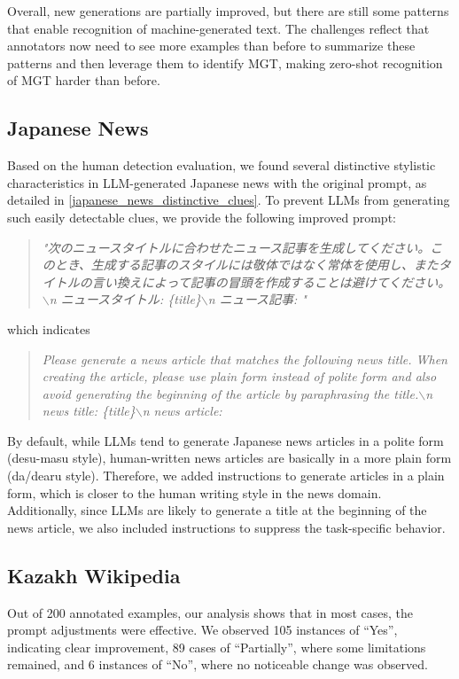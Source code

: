 Overall, new generations are partially improved, but there are still some patterns that enable recognition of machine-generated text. The challenges reflect that annotators now need to see more examples than before to summarize these patterns and then leverage them to identify MGT, making zero-shot recognition of MGT harder than before. 


\subsection{Japanese News}
Based on the human detection evaluation, we found several distinctive stylistic characteristics in LLM-generated Japanese news with the original prompt, as detailed in \ref{japanese_news_distinctive_clues}.
To prevent LLMs from generating such easily detectable clues, we provide the following improved prompt:

\begin{quote}
    \textit{"次のニュースタイトルに合わせたニュース記事を生成してください。このとき、生成する記事のスタイルには敬体ではなく常体を使用し、またタイトルの言い換えによって記事の冒頭を作成することは避けてください。$\backslash$n ニュースタイトル: \{title\}$\backslash$n ニュース記事: "}
\end{quote}
which indicates
\begin{quote}
    \textit{Please generate a news article that matches the following news title. When creating the article, please use plain form instead of polite form and also avoid generating the beginning of the article by paraphrasing the title.$\backslash$n news title: \{title\}$\backslash$n news article:} 
\end{quote}

By default, while LLMs tend to generate Japanese news articles in a polite form (desu-masu style), human-written news articles are basically in a more plain form (da/dearu style). Therefore, we added instructions to generate articles in a plain form, which is closer to the human writing style in the news domain. Additionally, since LLMs are likely to generate a title at the beginning of the news article, we also included instructions to suppress the task-specific behavior.


\subsection{Kazakh Wikipedia}
Out of 200 annotated examples, our analysis shows that in most cases, the prompt adjustments were effective. We observed 105 instances of ``Yes'', indicating clear improvement, 89 cases of ``Partially'', where some limitations remained, and 6 instances of ``No'', where no noticeable change was observed.

